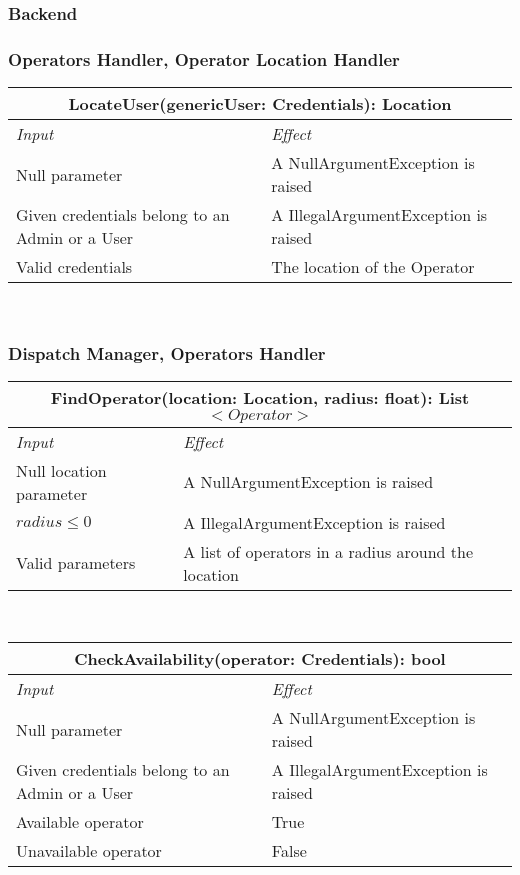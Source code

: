 	
	
	\subsubsection{Backend}
	
		\subsubsection*{Operators Handler, Operator Location Handler}
			\begin{tabular}{ |l|l| }
				\hline
				\multicolumn{2}{|c|}{LocateUser(genericUser: Credentials): Location}\\
				\hline
				\textit{Input} & \textit{Effect}\\ \hline
				Null parameter & A NullArgumentException is raised\\ \hline
				Given credentials belong to an Admin or a User & A IllegalArgumentException is raised\\ \hline
				Valid credentials & The location of the Operator\\ \hline
			\end{tabular}
			\\
		
		
		
		\subsubsection*{Dispatch Manager, Operators Handler}
			\begin{tabular}{ |l|l| }
				\hline
				\multicolumn{2}{|c|}{FindOperator(location: Location, radius: float): List$<Operator>$}\\
				\hline
				\textit{Input} & \textit{Effect}\\ \hline
				Null location parameter & A NullArgumentException is raised\\ \hline
				$radius \leq 0$ & A IllegalArgumentException is raised\\ \hline
				Valid parameters & A list of operators in a radius around the location\\ \hline
			\end{tabular}
			\\
			\begin{tabular}{ |l|l| }
				\hline
				\multicolumn{2}{|c|}{CheckAvailability(operator: Credentials): bool}\\
				\hline
				\textit{Input} & \textit{Effect}\\ \hline
				Null parameter & A NullArgumentException is raised\\ \hline
				Given credentials belong to an Admin or a User & A IllegalArgumentException is raised\\ \hline
				Available operator & True\\ \hline
				Unavailable operator & False\\ \hline
			\end{tabular}
			\\
			

